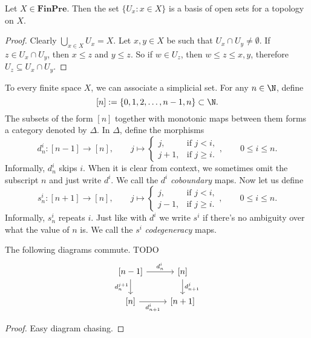 \begin{proposition}
Let $X \in \mathbf{FinPre}$. Then the set $\{U_x : x \in X\}$ is a basis of
open sets for a topology on $X$.
\end{proposition}
\begin{proof}
Clearly $\bigcup_{x \in X} U_x = X$. 
Let $x,y \in X$ be such that $U_x \cap U_y \neq \emptyset$.
If $z \in U_x \cap U_y$, then $x \leq z$ and $y \leq z$. So if $w \in U_z$,
then $w \leq z \leq x,y$, therefore $U_z \subseteq U_x \cap U_y$.
\end{proof}
To every finite space $X$, we can associate a simplicial set. For any $n \in \N$, define
\[ [n] := \left\{0,1,2,\ldots,n-1,n\right\} \subset \N. \]
The subsets of the form $[n]$ together with monotonic maps between them forms a category denoted by $\Delta$. In $\Delta$, define the morphisms
\[ d^i_n : [n-1] \to [n], \qquad j \mapsto \left\{ \begin{array}{ll} j ,& \text{if } j < i, \\ j+1 ,& \text{if } j \geq i. \end{array} \right. , \qquad 0 \leq i \leq n. \]
Informally, $d_n^i$ skips $i$. When it is clear from context, we sometimes omit the subscript $n$ and just write $d^i$. We call the $d^i$ \emph{coboundary} maps. Now let us define
\[ s^i_n : [n+1] \to [n], \qquad j \mapsto \left\{ \begin{array}{ll} j ,& \text{if } j < i, \\ j-1,& \text{if } j \geq i. \end{array} \right. , \qquad 0 \leq i \leq n. \]
Informally, $s_n^i$ repeats $i$. Just like with $d^i$ we write $s^i$ if there's no ambiguity over what the value of $n$ is. We call the $s^i$ \emph{codegeneracy} maps.

\begin{proposition}
\label{cosimplicial identities}
The following diagrams commute. TODO
\[ \begin{tikzcd}
\left[n-1\right] \arrow[r, "d^i_n"] \arrow[d, swap, "d^{j+1}_n"] & \left[n\right] \arrow[d, "d_{n+1}^j"] \\
\left[n\right] \arrow[r, swap, "d^i_{n+1}"] & \left[n+1\right]
\end{tikzcd} \]
\end{proposition}
\begin{proof}
Easy diagram chasing.
\end{proof}

